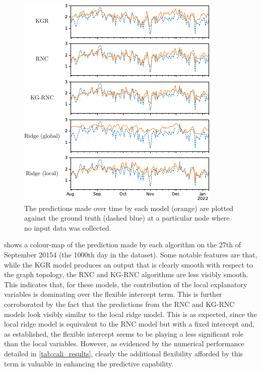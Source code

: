 \begin{figure}[h]
    \vspace*{2cm}
    \includegraphics[width=0.9\linewidth]{Figures/cali_preds.pdf}
    \vspace*{0.5cm}
    \caption[Model predictions vs ground truth at a particular node]{The  predictions made over time by each model (orange) are plotted against the ground truth (dashed blue) at a particular node where no input data was collected. }
    \label{fig:cali_preds_ts}
\end{figure}

\newpage

 shows a colour-map of the prediction made by each algorithm on the 27th of September 20154 (the 1000th day in the dataset). Some notable features are that, while the KGR model produces an output that is clearly smooth with respect to the graph topology, the RNC and KG-RNC algorithms are less visibly smooth. This indicates that, for these models, the contribution of the local explanatory variables is dominating over the flexible intercept term. This is further corroborated by the fact that the predictions from the RNC and KG-RNC models look visibly similar to the local ridge model. This is as expected, since the local ridge model is equivalent to the RNC model but with a fixed intercept and, as established, the flexible intercept seems to be playing a less significant role than the local variables. However, as evidenced by the numerical performance detailed in \cref{tab:cali_results}, clearly the additional flexibility afforded by this term is valuable in enhancing the predictive capability. 


